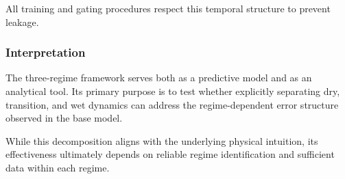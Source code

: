 All training and gating procedures respect this temporal structure to prevent leakage.

\subsubsection*{Interpretation}

The three-regime framework serves both as a predictive model and as an analytical tool. Its primary purpose is to test whether explicitly separating dry, transition, and wet dynamics can address the regime-dependent error structure observed in the base model.

While this decomposition aligns with the underlying physical intuition, its effectiveness ultimately depends on reliable regime identification and sufficient data within each regime.
